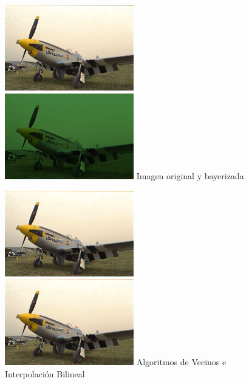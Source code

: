 {\begin{figure}[h]
       \includegraphics[width=0.5\textwidth]{imagenes/img9.png}
           \hfill
        \includegraphics[width=0.5\textwidth]{imagenes/img9_bayer.png}   
        Imagen original y bayerizada
\end{figure}

\begin{figure}[h]
       \includegraphics[width=0.5\textwidth]{imagenes/img9_demosicing_vecino.png}
           \hfill
        \includegraphics[width=0.5\textwidth]{imagenes/img9_demosicing_bilineal.png}
        Algoritmos de Vecinos e Interpolación Bilineal
\end{figure}


}
